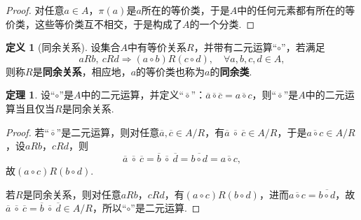 \documentclass[12pt]{ctexart}
\theoremstyle{definition}
\newtheorem{definition}{定义}[section]
\newtheorem{theorem}{定理}[section]
\theoremstyle{plain}
\begin{document}
\begin{proof}
	对任意$a\in A$，$\pi(a)$是$a$所在的等价类，于是$A$中的任何元素都有所在的等价类，这些等价类互不相交，于是构成了$A$的一个分类.
\end{proof}
\begin{definition}[同余关系]
	设集合$A$中有等价关系$R$，并带有二元运算“$\circ$”，若满足
	$$aRb,\ cRd\Rightarrow (a\circ b)R(c\circ d),\quad\forall a,b,c,d\in A,$$
	则称$R$是\textbf{同余关系}，相应地，$a$的等价类也称为$a$的\textbf{同余类}.
\end{definition}
\begin{theorem}
	设“$\circ$”是$A$中的二元运算，并定义“$\overline{\circ}$”：$\overline{a}\overline{\circ}\overline{c}=\overline{a\circ c}$，则“$\overline{\circ}$”是$A$中的二元运算当且仅当$R$是同余关系.
\end{theorem}
\begin{proof}
	若“$\overline{\circ}$”是二元运算，则对任意$\overline{a},\overline{c}\in A/R$，有$\overline{a}\ \overline{\circ}\ \overline{c}\in A/R$，于是$\overline{a\circ c}\in A/R$，设$aRb$，$cRd$，则
	$$\overline{a}\ \overline{\circ}\ \overline{c}=\overline{b}\ \overline{\circ}\ \overline{d}=\overline{b\circ d}=\overline{a\circ c},$$
	故$(a\circ c)R(b\circ d)$.
	
	若$R$是同余关系，则对任意$aRb$，$cRd$，有$(a\circ c)R(b\circ d)$，进而$\overline{a\circ c}=\overline{b\circ d}$，故$\overline{a}\ \overline{\circ}\ \overline{c}=\overline{b}\ \overline{\circ}\ \overline{d}\in A/R$，所以“$\circ$”是二元运算.
\end{proof}
\end{document}
